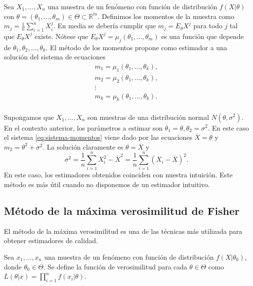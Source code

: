 \documentclass{article}
\begin{document}
Sea $X_1, \ldots, X_n$ una muestra de un fenómeno con función de distribución $f(X |\theta)$ con $\theta = (\theta_1, \ldots, \theta_m) \in \Theta \subset \mathbb{R}^m$. Definimos los momentos de la muestra como $m_j = \frac{1}{n} \sum_{i = 1}^n X_i^j$. En media se debería cumplir que $m_j = E_\theta X^j$ para todo $j$ tal que $E_\theta X^j$ existe. Nótese que $E_\theta X^j = \mu_j(\theta_1, \ldots, \theta_m)$ es una función que depende de $\theta_1, \theta_2, \ldots, \theta_k$. El método de los momentos propone como estimador a una solución del sistema de ecuaciones
\begin{equation} \label{eq:sistema-momentos}
    \begin{matrix}
        m_1 = \mu_1(\theta_1, \ldots, \theta_k), \\
        m_2 = \mu_2(\theta_1, \ldots, \theta_k), \\
        \vdots \\
        m_k = \mu_k(\theta_1, \ldots, \theta_k). \\
    \end{matrix}
\end{equation}

\begin{ex}
    Supongamos que $X_1, \ldots, X_n$ son muestras de una distribución normal $N(\theta, \sigma^2)$. En el contexto anterior, los parámetros a estimar son $\theta_1 = \theta, \theta_2 = \sigma^2$. En este caso el sistema \eqref{eq:sistema-momentos} viene dado por las ecuaciones $\overline{X} = \theta$ y $m_2 = \theta^2 + \sigma^2$. La solución claramente es $\theta = \overline{X}$ y
    \[\sigma^2 = \frac{1}{n} \sum_{i = 1}^n X_i^2 - \overline{X}^2 = \frac{1}{n} \sum_{i = 1}^n (X_i - \overline{X})^2.\]
    En este caso, los estimadores obtenidos coinciden con nuestra intuición. Este método es más útil cuando no disponemos de un estimador intuitivo.
\end{ex}

\subsection{Método de la máxima verosimilitud de Fisher}

    El método de la máxima verosimilitud es una de las técnicas más utilizada para obtener estimadores de calidad.

    \begin{definition}
        Sea $x_1, \ldots, x_n$ una muestra de un fenómeno con función de distribución $f(X | \theta_0)$, donde $\theta_0 \in \Theta$. Se define la función de verosimilitud para cada $\theta \in \Theta$ como $L(\theta | x) = \prod_{i = 1}^n f(x_i| \theta)$.
    \end{definition}
\end{document}
